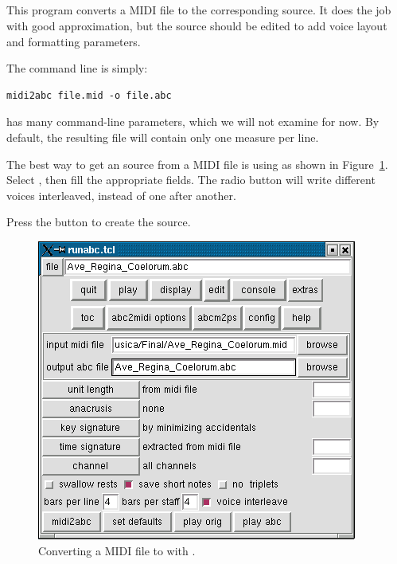 \documentclass[a4paper,fullpage,12pt]{book}
\begin{document}





\subsection{}

This program converts a MIDI file to the corresponding \ABC{} source.
It does the job with good approximation, but the source should be
edited to add voice layout and formatting parameters.

The command line is simply:

\begin{verbatim}
midi2abc file.mid -o file.abc
\end{verbatim}

 has many command-line parameters, which we will not
examine for now. By default, the resulting \ABC{} file will contain
only one measure per line.

The best way to get an \ABC{} source from a MIDI file is using
\runabc{} as shown in Figure~\ref{fig:runabc}. Select
, then fill the appropriate fields. The
 radio button will write different voices
interleaved, instead of one after another.

Press the button  to create the \ABC{} source.

\begin{figure}[htbp]
\centering
\includegraphics[scale=0.7]{runabc.png}
\caption{Converting a MIDI file to \ABC{} with \runabc{}.}
\label{fig:runabc}
\end{figure}
\end{document}
